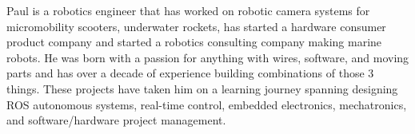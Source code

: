 

\begin{cvparagraph}

Paul is a robotics engineer that has worked on robotic camera systems for micromobility
scooters, underwater rockets, has started a hardware consumer product company
and started a robotics consulting company making marine robots. He was born with
a passion for anything with wires, software, and moving parts and has over a
decade of experience building combinations of those 3 things. These projects
have taken him on a learning journey spanning designing ROS autonomous systems,
real-time control, embedded electronics, mechatronics, and software/hardware
project management.
\end{cvparagraph}
